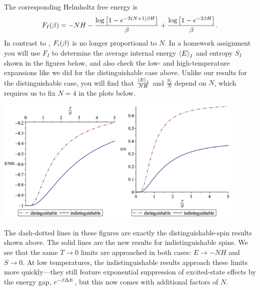 The corresponding Helmholtz free energy is
\begin{equation}
  \label{eq:indist_Helm}
  F_I(\beta) = -NH - \frac{\log\left[1 - e^{-2(N + 1) \beta H}\right]}{\beta} + \frac{\log\left[1 - e^{-2 \beta H}\right]}{\beta}.
\end{equation}
In contrast to , $F_i(\beta)$ is no longer proportional to $N$.
In a homework assignment you will use $F_I$ to determine the average internal energy $\left\langle E \right\rangle_I$ and entropy $S_I$ shown in the figures below, and also check the low- and high-temperature expansions like we did for the distinguishable case above.
Unlike our results for the distinguishable case, you will find that $\frac{\left\langle E \right\rangle_I}{NH}$ and $\frac{S_I}{N}$ depend on $N$, which requires us to fix $N = 4$ in the plots below.
\begin{center} %
  \includegraphics[width=0.45\textwidth]{figs/week03_energies.pdf}\hfill \includegraphics[width=0.45\textwidth]{figs/week03_entropies.pdf}
\end{center}

The dash-dotted lines in these figures are exactly the distinguishable-spin results shown above.
The solid lines are the new results for indistinguishable spins.
We see that the same $T \to 0$ limits are approached in both cases: $E \to -NH$ and $S \to 0$.
At low temperatures, the indistinguishable results approach these limits more quickly---they still feature exponential suppression of excited-state effects by the energy gap, $e^{-\beta \Delta E}$, but this now comes with additional factors of $N$.

